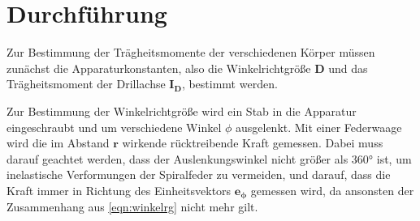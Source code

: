 \section{Durchführung}
\label{sec:Durchführung}

Zur Bestimmung der Trägheitsmomente der verschiedenen Körper müssen zunächst die
Apparaturkonstanten, also die Winkelrichtgröße $\symbf{D}$ und das Trägheitsmoment
der Drillachse $\symbf{I_D}$, bestimmt werden.

Zur Bestimmung der Winkelrichtgröße wird ein Stab in die Apparatur eingeschraubt und
um verschiedene Winkel $\phi$ ausgelenkt. Mit einer Federwaage wird die im Abstand
$\symbf{r}$ wirkende rücktreibende Kraft gemessen. Dabei muss darauf geachtet werden,
dass der Auslenkungswinkel nicht größer als 360° ist, um inelastische Verformungen der
Spiralfeder zu vermeiden, und darauf, dass die Kraft immer in Richtung des Einheitsvektors
$\symbf{e_{\phi}}$ gemessen wird, da ansonsten der Zusammenhang aus \eqref{eqn:winkelrg}
nicht mehr gilt.
